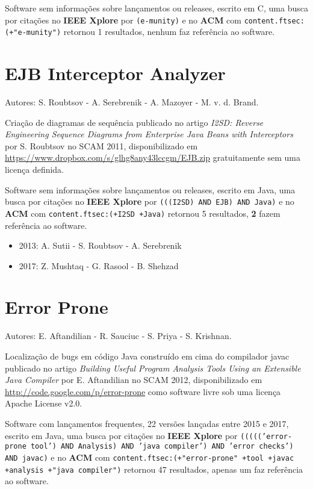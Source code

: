 Software sem informações sobre lançamentos ou releases,
escrito em C,
uma busca por citações no {\bf IEEE Xplore} por
\texttt{(e-munity)}
e no {\bf ACM} com
\texttt{content.ftsec:(+"e-munity")}
retornou
1 resultados,
nenhum faz referência ao software.


\section{EJB Interceptor Analyzer}

Autores:
S. Roubtsov - A. Serebrenik - A. Mazoyer - M. v. d. Brand.

Criação de diagramas de sequência
publicado no artigo {\it I2SD: Reverse Engineering Sequence Diagrams from Enterprise Java Beans with Interceptors}
por S. Roubtsov
no SCAM 2011,
disponibilizado em \url{https://www.dropbox.com/s/glhg8any43lccgm/EJB.zip}
gratuitamente
sem uma licença definida.

Software sem informações sobre lançamentos ou releases,
escrito em Java,
uma busca por citações no {\bf IEEE Xplore} por
\texttt{(((I2SD) AND EJB) AND Java)}
e no {\bf ACM} com
\texttt{content.ftsec:(+I2SD +Java)}
retornou
5 resultados,
{\bf 2} fazem referência ao software.

\begin{itemize}
\item 2013: A. Sutii - S. Roubtsov - A. Serebrenik
\item 2017: Z. Mushtaq - G. Rasool - B. Shehzad
\end{itemize}

\section{Error Prone}

Autores:
E. Aftandilian - R. Sauciuc - S. Priya - S. Krishnan.

Localização de bugs em código Java construído em cima do compilador javac
publicado no artigo {\it Building Useful Program Analysis Tools Using an Extensible Java Compiler}
por E. Aftandilian
no SCAM 2012,
disponibilizado em \url{http://code.google.com/p/error-prone}
como software livre
sob uma licença Apache License v2.0.

Software com lançamentos frequentes,
22 versões lançadas
entre 2015 e 2017,
escrito em Java,
uma busca por citações no {\bf IEEE Xplore} por
\texttt{((((('error-prone tool') AND Analysis) AND 'java compiler') AND 'error checks') AND javac)}
e no {\bf ACM} com
\texttt{content.ftsec:(+"error-prone" +tool +javac +analysis +"java compiler")}
retornou
47 resultados,
apenas um faz referência ao software.

